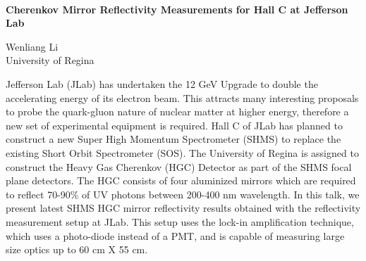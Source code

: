 \documentclass[12pt]{article}
\begin{document}
\begin{center}
{\bf ~\\\huge
Cherenkov Mirror Reflectivity Measurements for Hall C at Jefferson  Lab
}
\end{center}


\begin{center}
Wenliang Li \\[2mm]

University of Regina \\[3mm]

\end{center}

\normalsize
\noindent
Jefferson Lab (JLab) has undertaken the 12 GeV Upgrade to double the accelerating energy of its electron beam. This attracts many interesting proposals to probe the quark-gluon nature of nuclear matter at higher energy, therefore a new set of experimental equipment is required. Hall C of JLab has planned to construct a new Super High Momentum Spectrometer (SHMS) to replace the existing Short Orbit Spectrometer (SOS). The University of Regina is assigned to construct the Heavy Gas Cherenkov (HGC) Detector as part of the SHMS focal plane detectors. The HGC consists of four aluminized mirrors which are required to reflect 70-90\% of UV photons between 200-400 nm wavelength. In this talk, we present latest SHMS HGC mirror reflectivity results obtained with the reflectivity measurement setup at JLab. This setup uses the lock-in amplification technique, which uses a photo-diode instead of a PMT, and is capable of measuring large size optics up to 60 cm X 55 cm.
\end{document}
